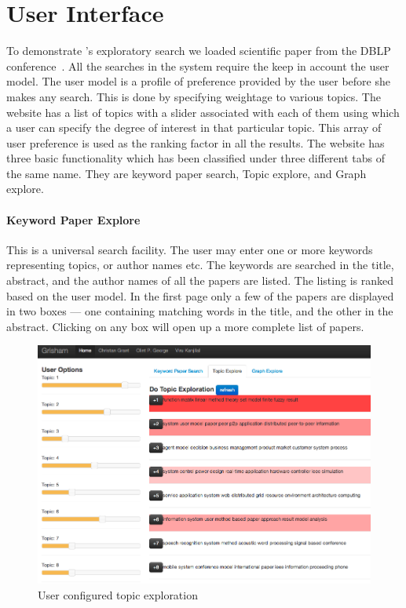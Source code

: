 
\section{User Interface}
\label{sec:demo}


To demonstrate \system's exploratory search we loaded scientific paper from the DBLP conference~\cite{Tang:2008:EMA:1367497.1367722}.
All the searches in the system require the keep in account the user model.
The user model is a profile of preference provided by the user before she makes any search.
This is done by specifying weightage to various topics.
The {\system} website has a list of topics with a slider associated with each of them using which a user can specify the degree of interest in that particular topic.
This array of user preference is used as the ranking factor in all the results.
The website has three basic functionality which has been classified under three different tabs of the same name.
They are keyword paper search, Topic explore, and Graph explore. 

\paragraph{Keyword Paper Explore}
This is a universal search facility.
The user may enter one or more keywords representing topics, or author names etc.
The keywords are searched in the title, abstract, and the author names of all the papers are listed.
The listing is ranked based on the user model.
In the first page only a few of the papers are displayed in two boxes --- one containing matching words in the title, and the other in the abstract.
Clicking on any box will open up a more complete list of papers.

\begin{figure}[htb]
\includegraphics[width=.5\textwidth]{images/topic_exploration.png} %
\caption{User configured topic exploration}
\label{fig:topic_exploration}
\end{figure}

